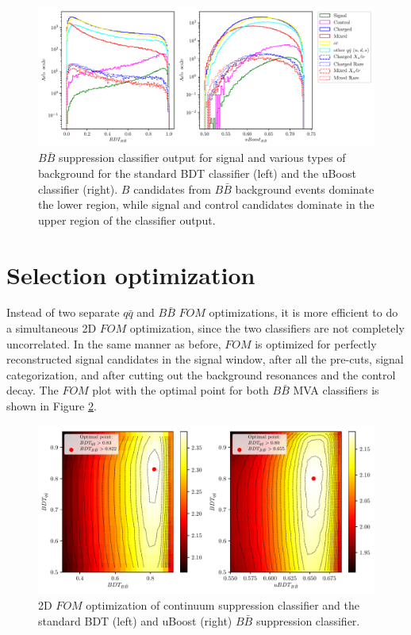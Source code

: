 \documentclass[  headings=standardclasses,
  headings=big,oneside,a4paper,openany,12pt]{scrbook}
\begin{document}
\begin{figure}[H]
\centering
\captionsetup{width=0.8\linewidth}
\includegraphics[width=\linewidth]{fig/bb_BDT}
\caption{$B\bar B$ suppression classifier output for signal and various types of background for the standard BDT classifier (left) and the uBoost classifier (right). $B$ candidates from $B\bar B$ background events dominate the lower region, while signal and control candidates dominate in the upper region of the classifier output.}
\label{fig:bbmva}
\end{figure}

\section{Selection optimization}

Instead of two separate $q \bar q$ and $B \bar B$ $FOM$ optimizations, it is more efficient to do a simultaneous 2D $FOM$ optimization, since the two classifiers are not completely uncorrelated. In the same manner as before, $FOM$ is optimized for perfectly reconstructed signal candidates in the signal window, after all the pre-cuts, signal categorization, and after cutting out the background resonances and the control decay. The $FOM$ plot with the optimal point for both $B \bar B$ MVA classifiers is shown in Figure \ref{fig:mvafom}.

\begin{figure}[H]
\centering
\captionsetup{width=0.8\linewidth}
\includegraphics[width=\linewidth]{fig/mva_fom}
\caption{2D $FOM$ optimization of continuum suppression classifier and the standard BDT (left) and uBoost (right) $B\bar B$ suppression classifier.}
\label{fig:mvafom}
\end{figure}
\end{document}
